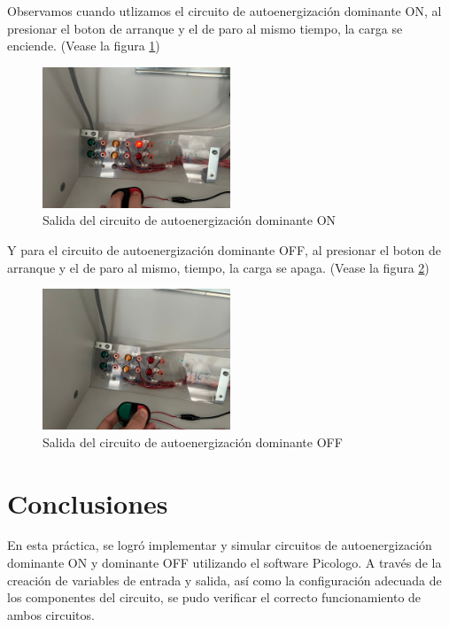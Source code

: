 \documentclass[12pt]{report}
\begin{document}
Observamos cuando utlizamos el circuito de autoenergización dominante ON, al presionar el boton de arranque y el de paro al mismo tiempo, la carga se enciende. (Vease la figura \ref{fig:dominante_on_output})
\begin{figure}[H]
  \centering
  \includegraphics[width=0.5\textwidth]{screenshots/salida_dominante_ON.png}
  \caption{Salida del circuito de autoenergización dominante ON}
  \label{fig:dominante_on_output}

\end{figure}

Y para el circuito de autoenergización dominante OFF, al presionar el boton de arranque y el de paro al mismo, tiempo, la carga se apaga. (Vease la figura \ref{fig:dominante_off_output})
\begin{figure}[H]
  \centering
  \includegraphics[width=0.5\textwidth]{screenshots/salida_dominante_OFF.png}
  \caption{Salida del circuito de autoenergización dominante OFF}
  \label{fig:dominante_off_output}
\end{figure}
\newpage

\chapter{Conclusiones}
En esta práctica, se logró implementar y simular circuitos de autoenergización dominante ON y dominante OFF utilizando el software Picologo. A través de la creación de variables de entrada y salida, así como la configuración adecuada de los componentes del circuito, se pudo verificar el correcto funcionamiento de ambos circuitos.
\end{document}
